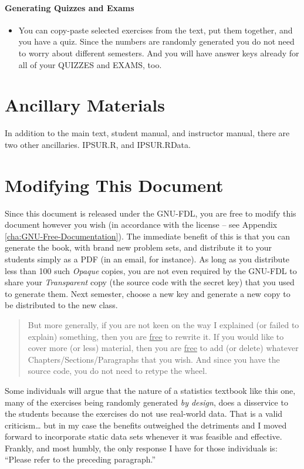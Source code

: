 \documentclass[captions=tableheading]{scrbook}
\begin{document}
\paragraph*{Generating Quizzes and Exams}
\begin{itemize}
\item You can copy-paste selected exercises from the text, put them together, and you have a quiz. Since the numbers are randomly generated you do not need to worry about different semesters. And you will have answer keys already for all of your QUIZZES and EXAMS, too.
\end{itemize}
\section{Ancillary Materials \label{sec:Ancillary-Materials}}
\label{sec-8-3}

In addition to the main text, student manual, and instructor manual, there are two other ancillaries. IPSUR.R, and IPSUR.RData.
\section{Modifying This Document \label{sec:Modifying-This-Document}}
\label{sec-8-4}

Since this document is released under the GNU-FDL, you are free to modify this document however you wish (in accordance with the license -- see Appendix \ref{cha:GNU-Free-Documentation}). The immediate benefit of this is that you can generate the book, with brand new problem sets, and distribute it to your students simply as a PDF (in an email, for instance). As long as you distribute less than 100 such \emph{Opaque} copies, you are not even required by the GNU-FDL to share your \emph{Transparent} copy (the source code with the secret key) that you used to generate them. Next semester, choose a new key and generate a new copy to be distributed to the new class. 

\begin{quote}
But more generally, if you are not keen on the way I explained (or failed to explain) something, then you are \underline{free} to rewrite it. If you would like to cover more (or less) material, then you are \underline{free} to add (or delete) whatever Chapters/Sections/Paragraphs that you wish. And since you have the source code, you do not need to retype the wheel. 
\end{quote}

Some individuals will argue that the nature of a statistics textbook like this one, many of the exercises being randomly generated \emph{by design}, does a disservice to the students because the exercises do not use real-world data. That is a valid criticism\ldots{} but in my case the benefits outweighed the detriments and I moved forward to incorporate static data sets whenever it was feasible and effective. Frankly, and most humbly, the only response I have for those individuals is: ``Please refer to the preceding paragraph.''
\end{document}
